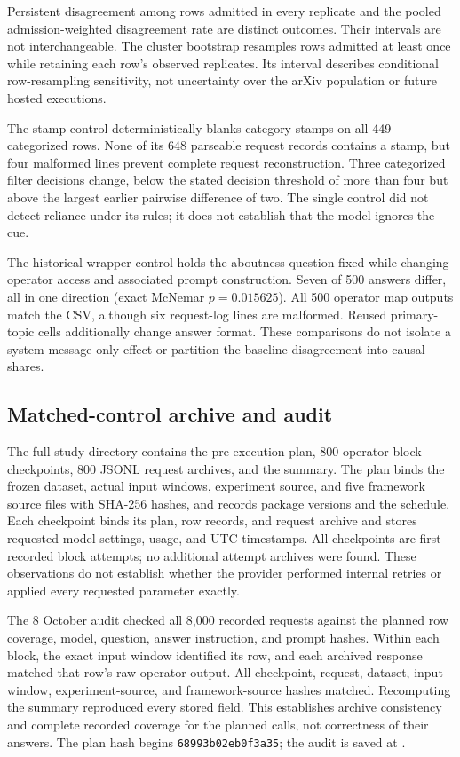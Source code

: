 \documentclass[11pt]{article}
\begin{document}
Persistent disagreement among rows admitted in every replicate and the pooled
admission-weighted disagreement rate are distinct outcomes. Their intervals are
not interchangeable. The cluster bootstrap resamples rows admitted at least
once while retaining each row's observed replicates. Its interval describes
conditional row-resampling sensitivity, not uncertainty over the arXiv
population or future hosted executions.

The stamp control deterministically blanks category stamps on all 449
categorized rows. None of its 648 parseable request records contains a stamp,
but four malformed lines prevent complete request reconstruction. Three
categorized filter decisions change, below the stated decision threshold of
more than four but above the largest earlier pairwise difference of two. The
single control did not detect reliance under its rules; it does not establish
that the model ignores the cue.

The historical wrapper control holds the aboutness question fixed while changing
operator access and associated prompt construction. Seven of 500 answers
differ, all in one direction (exact McNemar $p=0.015625$). All 500 operator map
outputs match the CSV, although six request-log lines are malformed. Reused
primary-topic cells additionally change answer format. These comparisons do not
isolate a system-message-only effect or partition the baseline disagreement
into causal shares.

\subsection{Matched-control archive and audit}
\label{sec:matched-evidence}
The full-study directory
 contains the pre-execution
plan, 800 operator-block checkpoints, 800 JSONL request archives, and the
summary. The plan binds the frozen dataset, actual input windows, experiment
source, and five framework source files with SHA-256 hashes, and records
package versions and the schedule. Each checkpoint binds its plan, row
records, and request archive and stores requested model settings, usage, and
UTC timestamps. All checkpoints are first recorded block attempts; no
additional attempt archives were found. These observations do not establish
whether the provider performed internal retries or applied every requested
parameter exactly.

The 8 October audit checked all 8,000 recorded requests against the planned
row coverage, model, question, answer instruction, and prompt hashes.
Within each block, the exact input window identified its row, and each
archived response matched that row's raw operator output. All checkpoint,
request, dataset, input-window, experiment-source, and framework-source
hashes matched. Recomputing the summary reproduced every stored field.
This establishes archive consistency and complete recorded coverage for the
planned calls, not correctness of their answers. The plan hash begins
\texttt{68993b02eb0f3a35}; the audit is saved at
.
\end{document}
